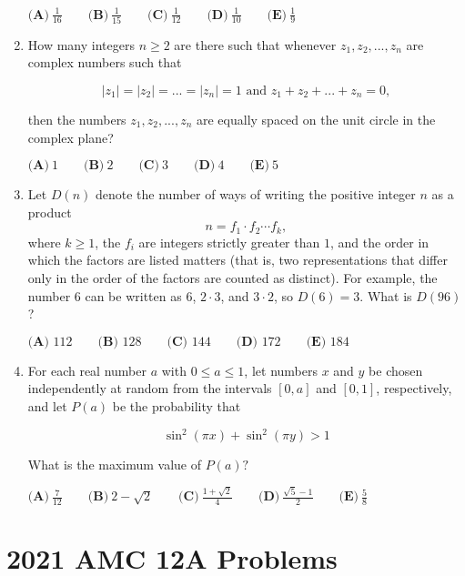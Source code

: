 \documentclass{article}
\begin{document}
\begin{enumerate}[label=\arabic*., itemsep=0.5em]
\(\textbf{(A)}\ \frac{1}{16} \qquad\textbf{(B)}\ \frac{1}{15} \qquad\textbf{(C)}\ \frac{1}{12} \qquad\textbf{(D)}\ \frac{1}{10} \qquad\textbf{(E)}\ \frac{1}{9}\)\par \vspace{0.5em}\item How many integers \(n \geq 2\) are there such that whenever \(z_1, z_2, ..., z_n\) are complex numbers such that


\begin{equation*}
|z_1| = |z_2| = ... = |z_n| = 1 \text{    and    } z_1 + z_2 + ... + z_n = 0,
\end{equation*}

then the numbers \(z_1, z_2, ..., z_n\) are equally spaced on the unit circle in the complex plane?

\(\textbf{(A)}\ 1 \qquad\textbf{(B)}\ 2 \qquad\textbf{(C)}\ 3 \qquad\textbf{(D)}\ 4 \qquad\textbf{(E)}\ 5\)\par \vspace{0.5em}\item Let \(D(n)\) denote the number of ways of writing the positive integer \(n\) as a product
\begin{equation*}
n = f_1\cdot f_2\cdots f_k,
\end{equation*}
where \(k\ge1\), the \(f_i\) are integers strictly greater than \(1\), and the order in which the factors are listed matters (that is, two representations that differ only in the order of the factors are counted as distinct). For example, the number \(6\) can be written as \(6\), \(2\cdot 3\), and \(3\cdot2\), so \(D(6) = 3\). What is \(D(96)\)?

\(\textbf{(A) } 112 \qquad\textbf{(B) } 128 \qquad\textbf{(C) } 144 \qquad\textbf{(D) } 172 \qquad\textbf{(E) } 184\)\par \vspace{0.5em}\item For each real number \(a\) with \(0 \leq a \leq 1\), let numbers \(x\) and \(y\) be chosen independently at random from the intervals \([0, a]\) and \([0, 1]\), respectively, and let \(P(a)\) be the probability that


\begin{equation*}
\sin^2{(\pi x)} + \sin^2{(\pi y)} > 1
\end{equation*}

What is the maximum value of \(P(a)?\)

\(\textbf{(A)}\ \frac{7}{12} \qquad\textbf{(B)}\ 2 - \sqrt{2} \qquad\textbf{(C)}\ \frac{1+\sqrt{2}}{4} \qquad\textbf{(D)}\ \frac{\sqrt{5}-1}{2} \qquad\textbf{(E)}\ \frac{5}{8}\)\par \vspace{0.5em}\end{enumerate}\newpage\section*{2021 AMC 12A Problems}
\end{document}
